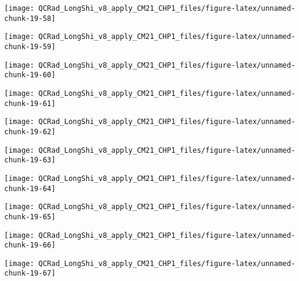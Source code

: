 \documentclass[
  10pt,
  a4paper,oneside]{article}
\begin{document}
\begin{center}\texttt{[image: QCRad\_LongShi\_v8\_apply\_CM21\_CHP1\_files/figure-latex/unnamed-chunk-19-58]} \end{center}

\begin{center}\texttt{[image: QCRad\_LongShi\_v8\_apply\_CM21\_CHP1\_files/figure-latex/unnamed-chunk-19-59]} \end{center}

\begin{center}\texttt{[image: QCRad\_LongShi\_v8\_apply\_CM21\_CHP1\_files/figure-latex/unnamed-chunk-19-60]} \end{center}

\begin{center}\texttt{[image: QCRad\_LongShi\_v8\_apply\_CM21\_CHP1\_files/figure-latex/unnamed-chunk-19-61]} \end{center}

\begin{center}\texttt{[image: QCRad\_LongShi\_v8\_apply\_CM21\_CHP1\_files/figure-latex/unnamed-chunk-19-62]} \end{center}

\begin{center}\texttt{[image: QCRad\_LongShi\_v8\_apply\_CM21\_CHP1\_files/figure-latex/unnamed-chunk-19-63]} \end{center}

\begin{center}\texttt{[image: QCRad\_LongShi\_v8\_apply\_CM21\_CHP1\_files/figure-latex/unnamed-chunk-19-64]} \end{center}

\begin{center}\texttt{[image: QCRad\_LongShi\_v8\_apply\_CM21\_CHP1\_files/figure-latex/unnamed-chunk-19-65]} \end{center}

\begin{center}\texttt{[image: QCRad\_LongShi\_v8\_apply\_CM21\_CHP1\_files/figure-latex/unnamed-chunk-19-66]} \end{center}

\begin{center}\texttt{[image: QCRad\_LongShi\_v8\_apply\_CM21\_CHP1\_files/figure-latex/unnamed-chunk-19-67]} \end{center}
\end{document}
